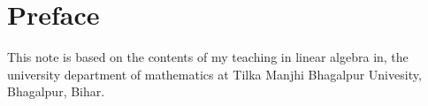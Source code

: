 \chapter*{Preface}
This note is based on the contents of my teaching in linear algebra in, the university department of mathematics at Tilka Manjhi Bhagalpur Univesity, Bhagalpur, Bihar. 
